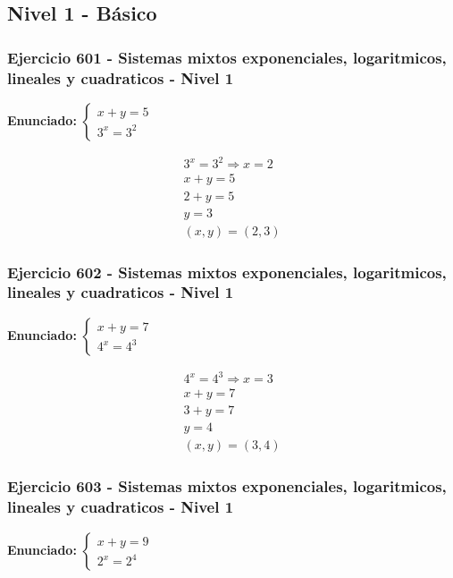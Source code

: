 \documentclass[12pt,a4paper]{article}
\begin{document}
\subsection*{Nivel 1 - Básico}

\subsubsection*{Ejercicio 601 - Sistemas mixtos exponenciales, logaritmicos, lineales y cuadraticos - Nivel 1}
\textbf{Enunciado:} \(\begin{cases} x+y=5\\ 3^x=3^{2}\end{cases}\)

\[
\begin{aligned}
3^x=3^{2}\Rightarrow x=2\\
x+y=5\\
2+y=5\\
y=3\\
\boxed{(x,y)=(2,3)}
\end{aligned}
\]


\subsubsection*{Ejercicio 602 - Sistemas mixtos exponenciales, logaritmicos, lineales y cuadraticos - Nivel 1}
\textbf{Enunciado:} \(\begin{cases} x+y=7\\ 4^x=4^{3}\end{cases}\)

\[
\begin{aligned}
4^x=4^{3}\Rightarrow x=3\\
x+y=7\\
3+y=7\\
y=4\\
\boxed{(x,y)=(3,4)}
\end{aligned}
\]


\subsubsection*{Ejercicio 603 - Sistemas mixtos exponenciales, logaritmicos, lineales y cuadraticos - Nivel 1}
\textbf{Enunciado:} \(\begin{cases} x+y=9\\ 2^x=2^{4}\end{cases}\)
\end{document}
